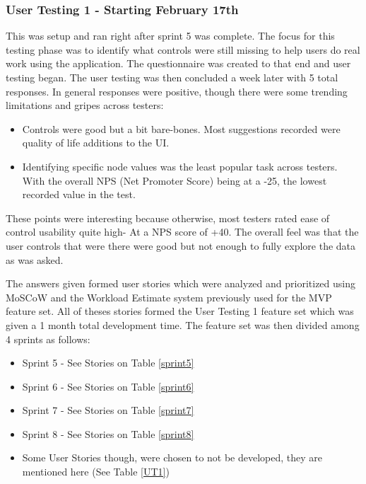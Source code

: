 \subsubsection{User Testing 1 - Starting February 17th} \label{usertestanalysis}
This was setup and ran right after sprint 5 was complete. The focus for this testing phase was to identify what controls were still missing to help users do real work using the application. The questionnaire was created to that end and user testing began. The user testing was then concluded a week later with 5 total responses. In general responses were positive, though there were some trending limitations and gripes across testers:

\begin{itemize}
    \item Controls were good but a bit bare-bones. Most suggestions recorded were quality of life additions to the UI.
    \item Identifying specific node values was the least popular task across testers. With the overall NPS (Net Promoter Score) being at a -25, the lowest recorded value in the test.
\end{itemize}

These points were interesting because otherwise, most testers rated ease of control usability quite high- At a NPS score of +40. The overall feel was that the user controls that were there were good but not enough to fully explore the data as was asked.

The answers given formed user stories which were analyzed and prioritized using MoSCoW and the Workload Estimate system previously used for the MVP feature set. All of theses stories formed the User Testing 1 feature set which was given a 1 month total development time. The feature set was then divided among 4 sprints as follows:

\begin{itemize}
    \item Sprint 5 - See Stories on Table \ref{sprint5}
    \item Sprint 6 - See Stories on Table \ref{sprint6}
    \item Sprint 7 - See Stories on Table \ref{sprint7}
    \item Sprint 8 - See Stories on Table \ref{sprint8}
    \item Some User Stories though, were chosen to not be developed, they are mentioned here (See Table \ref{UT1})
\end{itemize}

